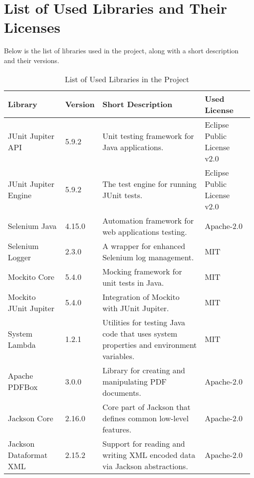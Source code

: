 \section{List of Used Libraries and Their Licenses}\label{sec:used-libraries}
Below is the list of libraries used in the project, along with a short description and their versions.
\begin{table}[ht!]
    \centering
    \setupBfhTabular
    \begin{tabular}{|p{4cm}|p{1cm}|p{5cm}|p{3cm}|} %
        \rowcolor{BFH-tablehead}
        \textbf{Library}       & \textbf{Version} & \textbf{Short Description}                                                             & \textbf{Used License}                            \\
        \hline
        JUnit \index{JUnit} Jupiter API & 5.9.2 & Unit testing framework for Java applications.
        & Eclipse Public License v2.0 \\
        \hline
        JUnit \index{JUnit} Jupiter Engine   & 5.9.2            & The test engine for running JUnit tests.
                                                      & Eclipse Public License v2.0 \index{Eclipse Public License v2.0 (EPL-2.0)} \\
        \hline
        Selenium Java \index{Selenium}          & 4.15.0           & Automation framework for web applications testing.
                                            & Apache-2.0 \\
        \hline
        Selenium Logger \index{Selenium}       & 2.3.0           & A wrapper for enhanced Selenium log management.
        & MIT \\
        \hline
        Mockito Core           & 5.4.0            & Mocking framework for unit tests in Java.
                                                     & MIT \\
        \hline
        Mockito JUnit \index{JUnit} Jupiter  & 5.4.0            & Integration of Mockito with JUnit Jupiter.
                                                    & MIT \\
        \hline
        System Lambda          & 1.2.1            & Utilities for testing Java code that uses system properties and environment variables.
        & MIT \\
        \hline
        Apache PDFBox          & 3.0.0            & Library for creating and manipulating PDF documents.
                                          & Apache-2.0 \\
        \hline
        Jackson Core           & 2.16.0           & Core part of Jackson that defines common low-level features.
        & Apache-2.0  \\
        \hline
        Jackson Dataformat XML & 2.15.2           & Support for reading and writing XML encoded data via Jackson abstractions.
        & Apache-2.0 \\
        \hline
    \end{tabular}
    \caption{List of Used Libraries in the Project}
    \label{tab:used-libraries}
\end{table}
